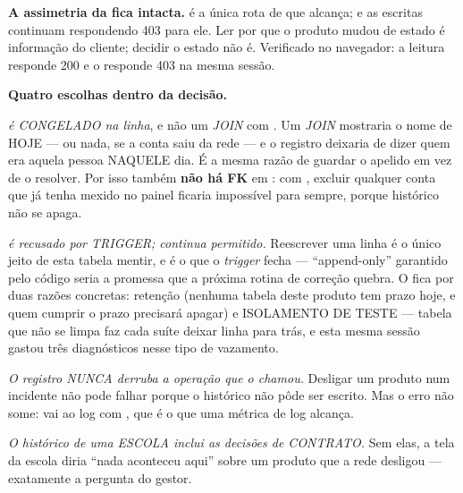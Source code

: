 \textbf{A assimetria da  fica intacta.}
 é a única rota de  que
 alcança;  e as escritas
continuam respondendo 403 para ele. Ler por que o produto mudou de estado é
informação do cliente; decidir o estado não é. Verificado no navegador: a leitura
responde 200 e o  responde 403 na mesma sessão.

\textbf{Quatro escolhas dentro da decisão.}

\emph{ é CONGELADO na linha}, e não um \emph{JOIN} com
. Um \emph{JOIN} mostraria o nome de HOJE --- ou nada, se a conta saiu
da rede --- e o registro deixaria de dizer quem era aquela pessoa NAQUELE dia.
É a mesma razão de  guardar o apelido em vez de
o resolver. Por isso também \textbf{não há FK} em : com
, excluir qualquer conta que já tenha mexido no painel ficaria
impossível para sempre, porque histórico não se apaga.

\emph{ é recusado por TRIGGER;  continua permitido.}
Reescrever uma linha é o único jeito de esta tabela mentir, e é o que o
\emph{trigger} fecha --- \enquote{append-only} garantido pelo código seria a
promessa que a próxima rotina de correção quebra. O  fica por duas
razões concretas: retenção (nenhuma tabela deste produto tem prazo hoje, e quem
cumprir o prazo precisará apagar) e ISOLAMENTO DE TESTE --- tabela que não se
limpa faz cada suíte deixar linha para trás, e esta mesma sessão gastou três
diagnósticos nesse tipo de vazamento.

\emph{O registro NUNCA derruba a operação que o chamou.} Desligar um produto num
incidente não pode falhar porque o histórico não pôde ser escrito. Mas o erro
não some: vai ao log com , que é o que
uma métrica de log alcança.

\emph{O histórico de uma ESCOLA inclui as decisões de CONTRATO.} Sem elas, a
tela da escola diria \enquote{nada aconteceu aqui} sobre um produto que a rede
desligou --- exatamente a pergunta do gestor.

